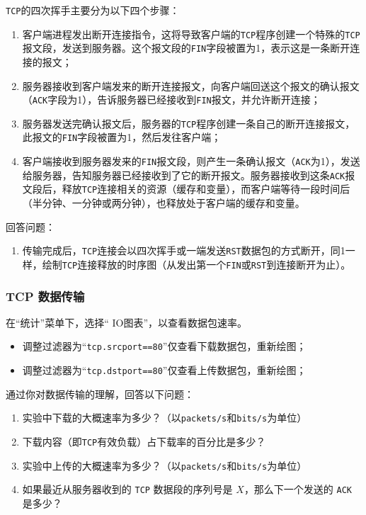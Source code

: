 \documentclass{article}
\begin{document}
\texttt{TCP}的四次挥手主要分为以下四个步骤：
\begin{enumerate}[noitemsep]
  \item 客户端进程发出断开连接指令，这将导致客户端的\texttt{TCP}程序创建一个特殊的\texttt{TCP}报文段，发送到服务器。这个报文段的\texttt{FIN}字段被置为1，表示这是一条断开连接的报文；
  \item 服务器接收到客户端发来的断开连接报文，向客户端回送这个报文的确认报文（\texttt{ACK}字段为1），告诉服务器已经接收到\texttt{FIN}报文，并允许断开连接；
  \item 服务器发送完确认报文后，服务器的\texttt{TCP}程序创建一条自己的断开连接报文，此报文的\texttt{FIN}字段被置为1，然后发往客户端；
  \item 客户端接收到服务器发来的\texttt{FIN}报文段，则产生一条确认报文（\texttt{ACK}为1），发送给服务器，告知服务器已经接收到了它的断开报文。服务器接收到这条\texttt{ACK}报文段后，释放\texttt{TCP}连接相关的资源（缓存和变量），而客户端等待一段时间后（半分钟、一分钟或两分钟），也释放处于客户端的缓存和变量。
\end{enumerate}

回答问题：
\begin{enumerate}[noitemsep]
  \item 传输完成后，\texttt{TCP}连接会以四次挥手或一端发送\texttt{RST}数据包的方式断开，同1一样，绘制\texttt{TCP}连接释放的时序图（从发出第一个\texttt{FIN}或\texttt{RST}到连接断开为止）。
\end{enumerate}

\subsubsection{TCP 数据传输}

在“统计”菜单下，选择“ IO图表”，以查看数据包速率。

\begin{itemize}
	\item 调整过滤器为“\texttt{tcp.srcport==80}”仅查看下载数据包，重新绘图；
	\item 调整过滤器为“\texttt{tcp.dstport==80}”仅查看上传数据包，重新绘图；
\end{itemize}

通过你对数据传输的理解，回答以下问题：

\begin{enumerate}[label={\arabic*）}, noitemsep]
  \item 实验中下载的大概速率为多少？（以\texttt{packets/s}和\texttt{bits/s}为单位）
  \item 下载内容（即\texttt{TCP}有效负载）占下载率的百分比是多少？
  \item 实验中上传的大概速率为多少？（以\texttt{packets/s}和\texttt{bits/s}为单位）
  \item 如果最近从服务器收到的 \texttt{TCP} 数据段的序列号是 $X$，那么下一个发送的 \texttt{ACK} 是多少？
\end{enumerate}
\end{document}
